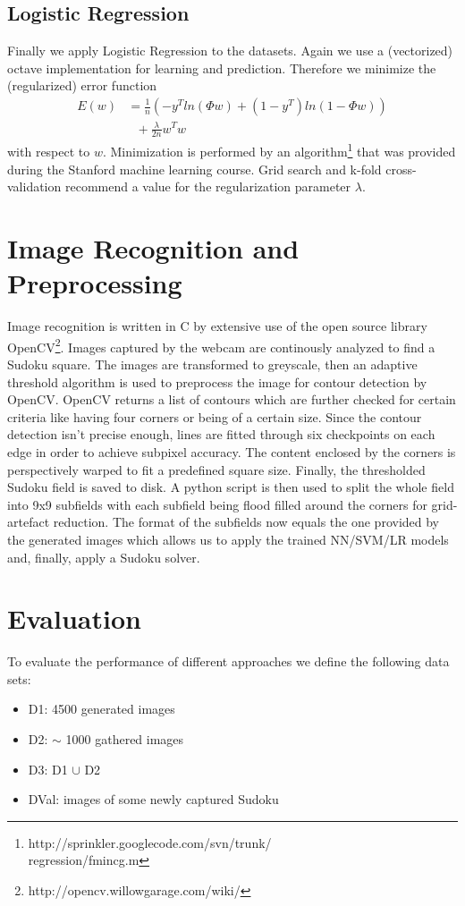 \documentclass{article}
\begin{document}
\subsection{Logistic Regression}
Finally we apply Logistic Regression to the datasets. Again we use a (vectorized) octave implementation for learning and prediction. Therefore we minimize the (regularized) error function
\begin{align*}
E(w) &= \frac{1}{n}(-y^T ln(\Phi w) + (1-y^T)ln(1-\Phi w))\\
&~~~+\frac{\lambda}{2n}w^Tw
\end{align*}
with respect to $w$. Minimization is performed by an algorithm\footnote{http://sprinkler.googlecode.com/svn/trunk/\\regression/fmincg.m} that was provided during the Stanford machine learning course. Grid search and k-fold cross-validation recommend a value for the regularization parameter $\lambda$.

\section{Image Recognition and Preprocessing}
Image recognition is written in C by extensive use of the open source library OpenCV\footnote{http://opencv.willowgarage.com/wiki/}. Images captured by the webcam are continously analyzed to find a Sudoku square. The images are transformed to greyscale, then an adaptive threshold algorithm is used to preprocess the image for contour detection by OpenCV. OpenCV returns a list of contours which are further checked for certain criteria like having four corners or being of a certain size. Since the contour detection isn't precise enough, lines are fitted through six checkpoints on each edge in order to achieve subpixel accuracy. The content enclosed by the corners is perspectively warped to fit a predefined square size. Finally, the thresholded Sudoku field is saved to disk. A python script is then used to split the whole field into 9x9 subfields with each subfield being flood filled around the corners for grid-artefact reduction. The format of the subfields now equals the one provided by the generated images which allows us to apply the trained NN/SVM/LR models and, finally, apply a Sudoku solver.

\section{Evaluation}
To evaluate the performance of different approaches we define the following data sets:
\begin{itemize}
\item D1: 4500 generated images
\item D2: $\sim$ 1000 gathered images
\item D3: D1 $\cup$ D2
\item DVal: images of some newly captured Sudoku
\end{itemize}
\end{document}

